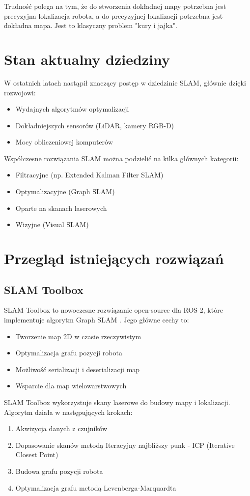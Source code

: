 \documentclass[a4paper,twoside,12pt]{book}
\begin{document}
Trudność polega na tym, że do stworzenia dokładnej mapy potrzebna jest precyzyjna lokalizacja robota, a do precyzyjnej lokalizacji potrzebna jest dokładna mapa. Jest to klasyczny problem "kury i jajka".

\section{Stan aktualny dziedziny}
W ostatnich latach nastąpił znaczący postęp w dziedzinie SLAM, głównie dzięki rozwojowi:
\begin{itemize}
\item Wydajnych algorytmów optymalizacji
\item Dokładniejszych sensorów (LiDAR, kamery RGB-D)
\item Mocy obliczeniowej komputerów
\end{itemize}

Współczesne rozwiązania SLAM można podzielić na kilka głównych kategorii:
\begin{itemize}
\item Filtracyjne (np. Extended Kalman Filter SLAM)
\item Optymalizacyjne (Graph SLAM)
\item Oparte na skanach laserowych
\item Wizyjne (Visual SLAM)
\end{itemize}

\section{Przegląd istniejących rozwiązań}

\subsection{SLAM Toolbox}
SLAM Toolbox to nowoczesne rozwiązanie open-source dla ROS 2, które implementuje algorytm Graph SLAM \cite{bib:slamtoolbox}. Jego główne cechy to:
\begin{itemize}
\item Tworzenie map 2D w czasie rzeczywistym
\item Optymalizacja grafu pozycji robota
\item Możliwość serializacji i deserializacji map
\item Wsparcie dla map wielowarstwowych
\end{itemize}

SLAM Toolbox wykorzystuje skany laserowe do budowy mapy i lokalizacji. Algorytm działa w następujących krokach:
\begin{enumerate}
\item Akwizycja danych z czujników
\item Dopasowanie skanów metodą Iteracyjny najbliższy punk - ICP (Iterative Closest Point)
\item Budowa grafu pozycji robota
\item Optymalizacja grafu metodą Levenberga-Marquardta
\end{enumerate}
\end{document}
